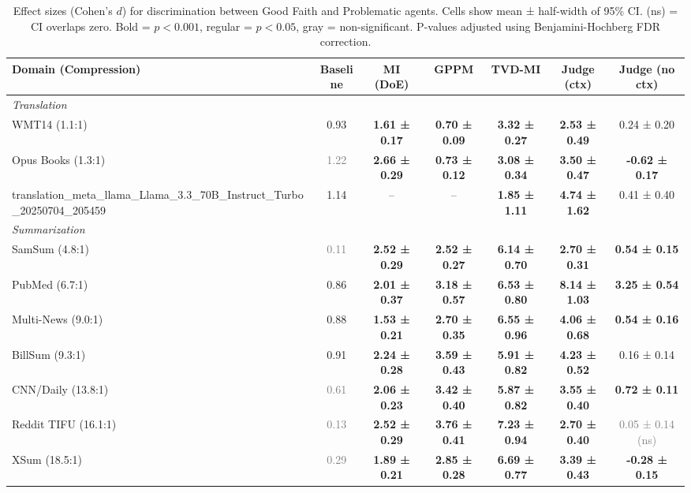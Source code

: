 \begin{table}[t]
\centering
\caption{Effect sizes (Cohen's $d$) for discrimination between Good Faith and Problematic agents. Cells show mean ± half-width of 95\% CI. (ns) = CI overlaps zero. Bold = $p<0.001$, regular = $p<0.05$, gray = non-significant. P-values adjusted using Benjamini-Hochberg FDR correction.}
\label{tab:effect_sizes}
\footnotesize
\begin{tabular}{@{}lcccccc@{}}
\toprule
\textbf{Domain (Compression)} & \textbf{Baseline} & \textbf{MI (DoE)} & \textbf{GPPM} & \textbf{TVD-MI} & \textbf{Judge (ctx)} & \textbf{Judge (no ctx)} \\
\midrule
\multicolumn{7}{l}{\textit{Translation}} \\
WMT14 (1.1:1) & 0.93 & \textbf{1.61 ± 0.17} & \textbf{0.70 ± 0.09} & \textbf{3.32 ± 0.27} & \textbf{2.53 ± 0.49} & 0.24 ± 0.20 \\
Opus Books (1.3:1) & \textcolor{gray}{1.22} & \textbf{2.66 ± 0.29} & \textbf{0.73 ± 0.12} & \textbf{3.08 ± 0.34} & \textbf{3.50 ± 0.47} & \textbf{-0.62 ± 0.17} \\
translation_meta_llama_Llama_3.3_70B_Instruct_Turbo_20250704_205459 & 1.14 & -- & -- & \textbf{1.85 ± 1.11} & \textbf{4.74 ± 1.62} & 0.41 ± 0.40 \\
\midrule
\multicolumn{7}{l}{\textit{Summarization}} \\
SamSum (4.8:1) & \textcolor{gray}{0.11} & \textbf{2.52 ± 0.29} & \textbf{2.52 ± 0.27} & \textbf{6.14 ± 0.70} & \textbf{2.70 ± 0.31} & \textbf{0.54 ± 0.15} \\
PubMed (6.7:1) & 0.86 & \textbf{2.01 ± 0.37} & \textbf{3.18 ± 0.57} & \textbf{6.53 ± 0.80} & \textbf{8.14 ± 1.03} & \textbf{3.25 ± 0.54} \\
Multi-News (9.0:1) & 0.88 & \textbf{1.53 ± 0.21} & \textbf{2.70 ± 0.35} & \textbf{6.55 ± 0.96} & \textbf{4.06 ± 0.68} & \textbf{0.54 ± 0.16} \\
BillSum (9.3:1) & 0.91 & \textbf{2.24 ± 0.28} & \textbf{3.59 ± 0.43} & \textbf{5.91 ± 0.82} & \textbf{4.23 ± 0.52} & 0.16 ± 0.14 \\
CNN/Daily (13.8:1) & \textcolor{gray}{0.61} & \textbf{2.06 ± 0.23} & \textbf{3.42 ± 0.40} & \textbf{5.87 ± 0.82} & \textbf{3.55 ± 0.40} & \textbf{0.72 ± 0.11} \\
Reddit TIFU (16.1:1) & \textcolor{gray}{0.13} & \textbf{2.52 ± 0.29} & \textbf{3.76 ± 0.41} & \textbf{7.23 ± 0.94} & \textbf{2.70 ± 0.40} & \textcolor{gray}{0.05 ± 0.14 (ns)} \\
XSum (18.5:1) & \textcolor{gray}{0.29} & \textbf{1.89 ± 0.21} & \textbf{2.85 ± 0.28} & \textbf{6.69 ± 0.77} & \textbf{3.39 ± 0.43} & \textbf{-0.28 ± 0.15} \\

\end{tabular}
\end{table}
